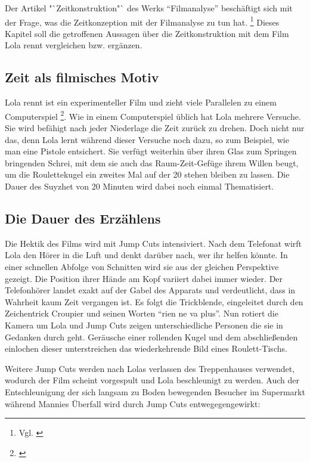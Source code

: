 Der Artikel "`Zeitkonstruktion"` des Werks "`Filmanalyse"' beschäftigt sich mit der Frage, was die Zeitkonzeption mit der Filmanalyse zu tun hat.  \footnote{Vgl. \cite[S. 204]{keutzer2014filmanalyse}} Dieses Kapitel soll die getroffenen Aussagen über die Zeitkonstruktion mit dem Film Lola rennt vergleichen bzw. ergänzen.

\subsection{Zeit als filmisches Motiv}
\label{lab:ZeitAlsFilmischesMotiv} 


Lola rennt ist ein experimenteller Film und zieht viele Parallelen zu einem Computerspiel \footnote{\cite{AllesBlossEinSpiel}}. Wie in einem Computerspiel üblich hat Lola mehrere Versuche. Sie wird befähigt nach jeder Niederlage die Zeit zurück zu drehen. Doch nicht nur das, denn Lola lernt während dieser Versuche noch dazu, so zum Beispiel, wie man eine Pistole entsichert. Sie verfügt weiterhin über ihren Glas zum Springen bringenden Schrei, mit dem sie auch das Raum-Zeit-Gefüge ihrem Willen beugt, um die Roulettekugel ein zweites Mal auf der 20 stehen bleiben zu lassen. Die Dauer des Suyzhet von 20 Minuten wird dabei noch einmal Thematisiert. 

\subsection{Die Dauer des Erzählens}

Die Hektik des Films wird mit Jump Cuts intensiviert. Nach dem Telefonat wirft Lola den Hörer in die Luft und denkt darüber nach, wer ihr helfen könnte. In einer schnellen Abfolge von Schnitten wird sie aus der gleichen Perspektive gezeigt. Die Position ihrer Hände am Kopf variiert dabei immer wieder. Der Telefonhörer landet exakt auf der Gabel des Apparats und verdeutlicht, dass in Wahrheit kaum Zeit vergangen ist. Es folgt die Trickblende, eingeleitet durch den Zeichentrick Croupier und seinen Worten "`ri­en ne va plus"'. Nun rotiert die Kamera um Lola und Jump Cuts zeigen unterschiedliche Personen die sie in Gedanken durch geht. Geräusche einer rollenden Kugel und dem abschließenden einlochen dieser unterstreichen das wiederkehrende Bild eines Roulett-Tischs.

Weitere Jump Cuts werden nach Lolas verlassen des Treppenhauses verwendet, wodurch der Film scheint vorgespult und Lola beschleunigt zu werden. Auch der Entschleunigung der sich langsam zu Boden bewegenden Besucher im Supermarkt während Mannies Überfall wird durch Jump Cuts entwegegengewirkt:

